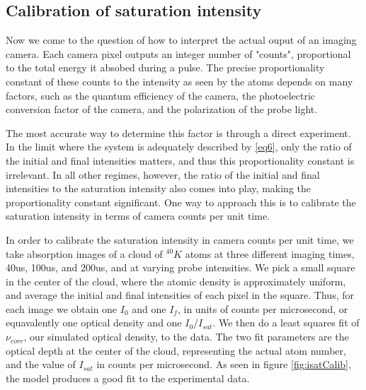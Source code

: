 \documentclass[12pt]{iopart}
\begin{document}
\subsection{Calibration of saturation intensity}
Now we come to the question of how to interpret the actual ouput of an imaging camera. Each camera pixel outputs an integer number of "counts", proportional to the total energy it absobed during a pulse. The precise proportionality constant of these counts to the intensity as seen by the atoms depends on many factors, such as the quantum efficiency of the camera, the photoelectric conversion factor of the camera, and the polarization of the probe light. 
\par The most accurate way to determine this factor is through a direct experiment. In the limit where the system is adequately described by \ref{eq6}, only the ratio of the initial and final intensities matters, and thus this proportionality constant is irrelevant. In all other regimes, however, the ratio of the initial and final intensities to the saturation intensity also comes into play, making the proportionality constant significant. One way to approach this is to calibrate the saturation intensity in terms of camera counts per unit time. 
\par In order to calibrate the saturation intensity in camera counts per unit time, we take absorption images of a cloud of $^{40}K$ atoms at three different imaging times, 40us, 100us, and 200us, and at varying probe intensities. We pick a small square in the center of the cloud, where the atomic density is approximately uniform, and average the initial and final intensities of each pixel in the square. Thus, for each image we obtain one $I_0$ and one $I_f$, in units of counts per microsecond, or equavalently one optical density and one $I_0/I_{sat}$. We then do a least squares fit of $\nu_{corr}$, our simulated optical density, to the data. The two fit parameters are the optical depth at the center of the cloud, representing the actual atom number, and the value of $I_{sat}$ in counts per microsecond. As seen in figure \ref{fig:isatCalib}, the model produces a good fit to the experimental data. 
\end{document}
